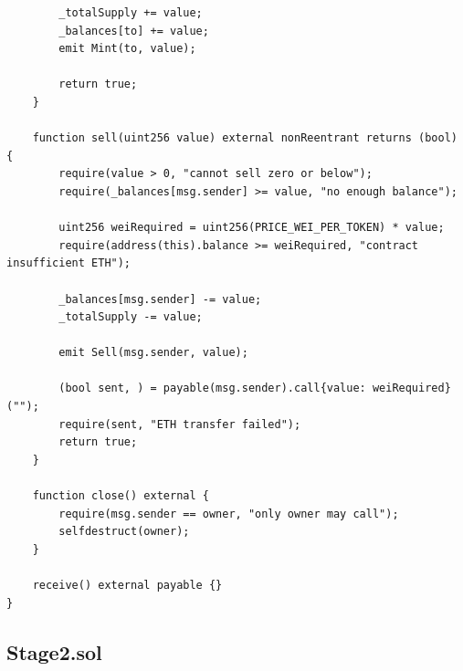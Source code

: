 \documentclass[10pt,a4paper]{article}
\begin{document}
\begin{lstlisting}
        _totalSupply += value;
        _balances[to] += value;
        emit Mint(to, value);

        return true;
    }

    function sell(uint256 value) external nonReentrant returns (bool) {
        require(value > 0, "cannot sell zero or below");
        require(_balances[msg.sender] >= value, "no enough balance");

        uint256 weiRequired = uint256(PRICE_WEI_PER_TOKEN) * value;
        require(address(this).balance >= weiRequired, "contract insufficient ETH");

        _balances[msg.sender] -= value;
        _totalSupply -= value;

        emit Sell(msg.sender, value);

        (bool sent, ) = payable(msg.sender).call{value: weiRequired}("");
        require(sent, "ETH transfer failed");
        return true;
    }

    function close() external {
        require(msg.sender == owner, "only owner may call");
        selfdestruct(owner);
    }

    receive() external payable {}
}
\end{lstlisting}

\newpage
\subsection*{Stage2.sol}
\end{document}

